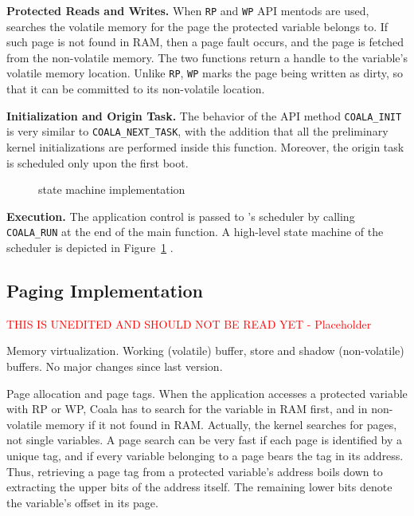 \textbf{Protected Reads and Writes.} When \texttt{RP} and \texttt{WP} API mentods are used, \sys searches the volatile memory for the page the protected variable belongs to. If such page is not found in RAM, then a page fault occurs, and the page is fetched from the non-volatile memory. The two functions return a handle to the variable's volatile memory location. Unlike \texttt{RP}, \texttt{WP} marks the page being written as dirty, so that it can be committed to its non-volatile location.

\textbf{Initialization and Origin Task.} The behavior of the API method \texttt{COALA\_INIT} is very similar to \texttt{COALA\_NEXT\_TASK}, with the addition that all the preliminary kernel initializations are performed inside this function. Moreover, the origin task is scheduled only upon the first boot.

\begin{figure}
	\centering
	\caption{\sys state machine implementation }
	\label{fig:coala_state_machine}
\end{figure}

\textbf{Execution.} The application control is passed to \sys's scheduler by calling \texttt{COALA\_RUN} at the end of the main function. A high-level state machine of the scheduler is depicted in Figure~\ref{fig:coala_state_machine} .

\subsection{\sys Paging Implementation}

\textcolor{red}{THIS IS UNEDITED AND SHOULD NOT BE READ YET - Placeholder}

Memory virtualization. Working (volatile) buffer, store and shadow (non-volatile) buffers. No major changes since last version.

Page allocation and page tags. When the application accesses a protected variable with RP or WP, Coala has to search for the variable in RAM first, and in non-volatile memory if it not found in RAM. Actually, the kernel searches for pages, not single variables. A page search can be very fast if each page is identified by a unique tag, and if every variable belonging to a page bears the tag in its address. Thus, retrieving a page tag from a protected variable’s address boils down to extracting the upper bits of the address itself. The remaining lower bits denote the variable’s offset in its page.

